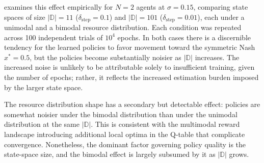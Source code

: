 \documentclass{article}
\begin{document}
                 examines this effect empirically for $N = 2$ agents at $\sigma = 0.15$, comparing state spaces of size $|\mathbb{D}| = 11$ ($\delta_{\mathrm{step}} = 0.1$) and $|\mathbb{D}| = 101$ ($\delta_{\mathrm{step}} = 0.01$), each under a unimodal and a bimodal resource distribution. Each condition was repeated across 100 independent trials of $10^4$ epochs. In both cases there is a discernible tendency for the learned policies to favor movement toward the symmetric Nash $x^* = 0.5$, but the policies become substantially noisier as $|\mathbb{D}|$ increases. The increased noise is unlikely to be attributable solely to insufficient training, given the number of epochs; rather, it reflects the increased estimation burden imposed by the larger state space.
                
                The resource distribution shape has a secondary but detectable effect: policies are somewhat noisier under the bimodal distribution than under the unimodal distribution at the same $|\mathbb{D}|$. This is consistent with the multimodal reward landscape introducing additional local optima in the Q-table that complicate convergence. Nonetheless, the dominant factor governing policy quality is the state-space size, and the bimodal effect is largely subsumed by it as $|\mathbb{D}|$ grows.
        \clearpage
\end{document}
